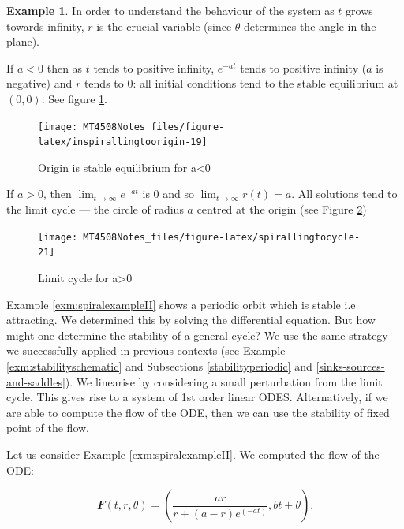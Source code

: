 \documentclass[
  a4paper,
  oneside,
  final]{krantz}
\renewcommand{\v}[1]{{\mathbfit{#1}}}
\theoremstyle{definition}
\theoremstyle{definition}
\newtheorem{example}{Example}[chapter]
\theoremstyle{definition}
\theoremstyle{definition}
\theoremstyle{remark}
\begin{document}
\begin{example}
In order to understand the behaviour of the system as \(t\) grows towards infinity, \(r\) is the crucial variable (since \(\theta\) determines the angle in the plane).

If \(a< 0\) then as \(t\) tends to positive infinity, \(e^{-at}\) tends to positive infinity (\(a\) is negative) and \(r\) tends to \(0\): all initial conditions tend to the stable equilibrium at \((0,0)\). See figure \ref{fig:inspirallingtoorigin}.

\begin{figure}

{\centering \texttt{[image: MT4508Notes\_files/figure-latex/inspirallingtoorigin-19]} 

}

\caption{Origin is stable equilibrium for a<0}\label{fig:inspirallingtoorigin}
\end{figure}

If \(a>0\), then \(\lim_{t \to \infty} e^{-at}\) is \(0\) and so \(\lim_{t \to \infty} r(t) = a\). All solutions tend to the limit cycle --- the circle of radius \(a\) centred at the origin (see Figure \ref{fig:spirallingtocycle})

\begin{figure}

{\centering \texttt{[image: MT4508Notes\_files/figure-latex/spirallingtocycle-21]} 

}

\caption{Limit cycle for a>0}\label{fig:spirallingtocycle}
\end{figure}

\end{example}

Example \ref{exm:spiralexampleII} shows a periodic orbit which is stable i.e attracting. We determined this by solving the differential equation. But how might one determine the stability of a general cycle? We use the same strategy we successfully applied in previous contexts (see Example \ref{exm:stabilityschematic} and Subsections \ref{stabilityperiodic} and \ref{sinks-sources-and-saddles}). We linearise by considering a small perturbation from the limit cycle. This gives rise to a system of 1st order linear ODES. Alternatively, if we are able to compute the flow of the ODE, then we can use the stability of fixed point of the flow.

Let us consider Example \ref{exm:spiralexampleII}. We computed the flow of the ODE:

\[ \v{F}(t,r, \theta) = \left(\frac{ ar}{ r + (a-r) e^{(-at)}}, bt + \theta\right).\]
\end{document}
